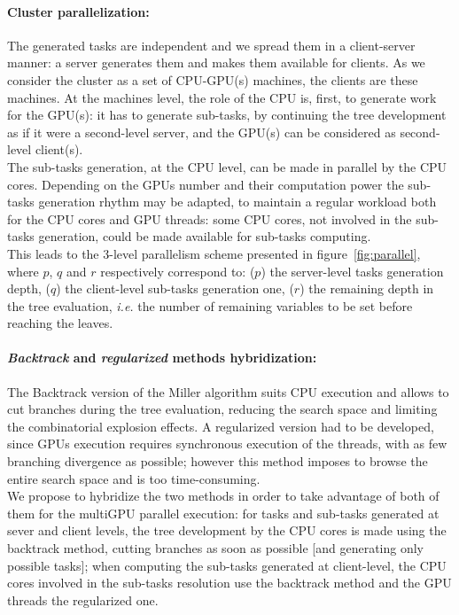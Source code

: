 \paragraph{Cluster parallelization: } 
The generated tasks are independent and we spread them in a client-server manner: a server generates them and makes them available for clients. As we consider the cluster as a set of CPU-GPU(s) machines, the clients are these machines. 
At the machines level, the role of the CPU is, first, to generate work for the GPU(s): it has to generate sub-tasks, by continuing the tree development as if it were a second-level server, and the GPU(s) can be considered as second-level client(s). \\
The sub-tasks generation, at the CPU level, can be made in parallel by the CPU cores. Depending on the GPUs number and their computation power the sub-tasks generation rhythm may be adapted, to maintain a regular workload both for the CPU cores and GPU threads: some CPU cores, not involved in the sub-tasks generation, could be made available for sub-tasks computing.\\
This leads to the 3-level parallelism scheme presented in figure~\ref{fig:parallel}, where $p$, $q$ and $r$ respectively correspond to: ($p$) the server-level tasks generation depth, ($q$) the client-level sub-tasks generation one, ($r$) the remaining depth in the tree evaluation, \textit{i.e.} the number of remaining variables to be set before reaching the leaves.  

\paragraph{\emph{Backtrack} and \emph{regularized} methods hybridization: } 
The Backtrack version of the Miller algorithm suits CPU execution and allows to cut branches during the tree evaluation, reducing the search space and limiting the combinatorial explosion effects. A regularized version had to be developed, since GPUs execution requires synchronous execution of the threads, with as few branching divergence as possible; however this method imposes to browse the entire search space and is too time-consuming. \\
We propose to hybridize the two methods in order to take advantage of both of them for the multiGPU parallel execution: 
for tasks and sub-tasks generated at sever and client levels, the tree development by the CPU cores is made using the backtrack method, cutting branches as soon as possible [and generating only possible tasks]; when computing the sub-tasks generated at client-level, the CPU cores involved in the sub-tasks resolution use the backtrack method and the GPU threads the regularized one. 

